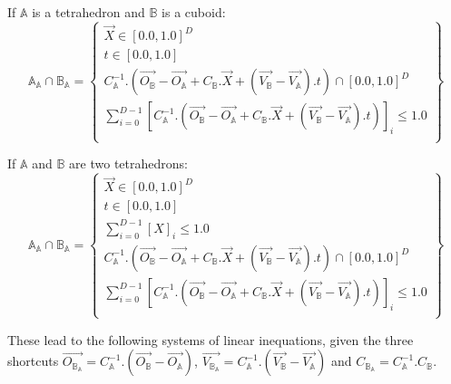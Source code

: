 \documentclass[12pt, a4paper]{article}
\begin{document}
If $\mathbb{A}$ is a tetrahedron and $\mathbb{B}$ is a cuboid:
\begin{equation}
\mathbb{A}_\mathbb{A}\cap\mathbb{B}_\mathbb{A}=\left\lbrace
\begin{array}{c}
\overrightarrow{X}\in[0.0,1.0]^D\\
t\in[0.0,1.0]\\
C_\mathbb{A}^{-1}.\left(\overrightarrow{O_\mathbb{B}}-\overrightarrow{O_\mathbb{A}}+C_\mathbb{B}.\overrightarrow{X}+\left(\overrightarrow{V_\mathbb{B}}-\overrightarrow{V_\mathbb{A}}\right).t\right)\cap[0.0,1.0]^D\\
\sum_{i=0}^{D-1}\left[C_\mathbb{A}^{-1}.\left(\overrightarrow{O_\mathbb{B}}-\overrightarrow{O_\mathbb{A}}+C_\mathbb{B}.\overrightarrow{X}+\left(\overrightarrow{V_\mathbb{B}}-\overrightarrow{V_\mathbb{A}}\right).t\right)\right]_i\le1.0\\
\end{array}
\right\rbrace
\end{equation}

If $\mathbb{A}$ and $\mathbb{B}$ are two tetrahedrons:
\begin{equation}
\mathbb{A}_\mathbb{A}\cap\mathbb{B}_\mathbb{A}=\left\lbrace
\begin{array}{c}
\overrightarrow{X}\in[0.0,1.0]^D\\
t\in[0.0,1.0]\\
\sum_{i=0}^{D-1}\left[X\right]_i\le1.0\\
C_\mathbb{A}^{-1}.\left(\overrightarrow{O_\mathbb{B}}-\overrightarrow{O_\mathbb{A}}+C_\mathbb{B}.\overrightarrow{X}+\left(\overrightarrow{V_\mathbb{B}}-\overrightarrow{V_\mathbb{A}}\right).t\right)\cap[0.0,1.0]^D\\
\sum_{i=0}^{D-1}\left[C_\mathbb{A}^{-1}.\left(\overrightarrow{O_\mathbb{B}}-\overrightarrow{O_\mathbb{A}}+C_\mathbb{B}.\overrightarrow{X}+\left(\overrightarrow{V_\mathbb{B}}-\overrightarrow{V_\mathbb{A}}\right).t\right)\right]_i\le1.0\\
\end{array}
\right\rbrace
\end{equation}

These lead to the following systems of linear inequations, given the three shortcuts $\overrightarrow{O_{\mathbb{B}_\mathbb{A}}}=C_\mathbb{A}^{-1}.(\overrightarrow{O_\mathbb{B}}-\overrightarrow{O_\mathbb{A}})$, $\overrightarrow{V_{\mathbb{B}_\mathbb{A}}}=C_\mathbb{A}^{-1}.(\overrightarrow{V_\mathbb{B}}-\overrightarrow{V_\mathbb{A}})$ and $C_{\mathbb{B}_\mathbb{A}}=C_\mathbb{A}^{-1}.C_{\mathbb{B}}$.
\end{document}
